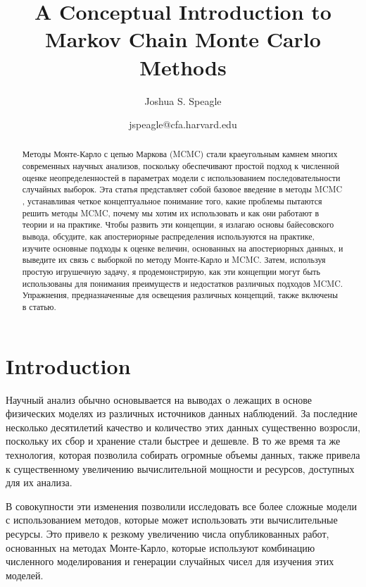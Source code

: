 \documentclass[12pt, titlepage]{article}
\title{A Conceptual Introduction to Markov Chain Monte Carlo Methods}
\author[]{Joshua S. Speagle}
\affil[]{Center for Astrophysics\,\textbar\,Harvard \& Smithsonian, 60 Garden St., Cambridge, MA 02138, USA}
\date{jspeagle@cfa.harvard.edu}
\begin{document}
\maketitle

\begin{abstract}
Методы Монте-Карло с цепью Маркова (MCMC) стали краеугольным
камнем многих современных научных анализов, поскольку обеспечивают простой
подход к численной оценке неопределенностей в параметрах модели
с использованием последовательности случайных выборок.
Эта статья представляет собой базовое введение в методы MCMC
, устанавливая четкое концептуальное понимание
того, какие проблемы пытаются решить
методы MCMC, почему мы хотим их использовать и
как они работают в теории и на практике.
Чтобы развить эти концепции, я излагаю основы байесовского вывода,
обсудите, как апостериорные распределения используются на практике,
изучите основные подходы к оценке величин, основанных на апостериорных данных, и
выведите их связь с выборкой по методу Монте-Карло и MCMC.
Затем, используя простую игрушечную задачу, я продемонстрирую, как эти концепции
могут быть использованы для понимания преимуществ и недостатков различных подходов MCMC.
Упражнения, предназначенные для освещения различных концепций, также включены в
статью.
\end{abstract}



\section{Introduction} \label{sec:intro}

Научный анализ обычно основывается на выводах о
лежащих в основе физических моделях из различных источников данных наблюдений.
За последние несколько десятилетий качество и количество этих
данных существенно возросли, поскольку их
сбор и хранение стали быстрее и дешевле. В то же время та же технология, которая
позволила собирать огромные объемы данных, также привела к
существенному увеличению вычислительной мощности и ресурсов, доступных для их анализа. 

В совокупности эти изменения позволили исследовать
все более сложные модели с использованием методов, которые
может использовать эти вычислительные ресурсы. Это привело к
резкому увеличению числа опубликованных работ, основанных на
методах Монте-Карло, которые используют
комбинацию численного моделирования и генерации случайных чисел
для изучения этих моделей.
\end{document}
